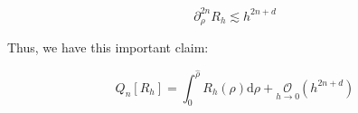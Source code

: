 ﻿\documentclass{article}
\begin{document}
\begin{corollary}
  \begin{equation}
    \partial^{2n}_\rho R_h \lesssim h^{2n+d}
  \end{equation}
\end{corollary}

Thus, we have this important claim:

\begin{equation}
  \boxed{Q_n[R_h] = \int_{0}^{\hat\rho}R_h(\rho)\mathrm d\rho + \underset{h\to 0}{\mathcal O}(h^{2n+d})}
\end{equation}



%  






\end{document}
